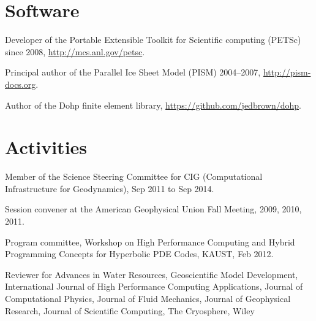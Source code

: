 \documentclass[10pt,letterpaper]{article}
\renewenvironment{itemize}{
  \begin{list}{}{
    \setlength{\leftmargin}{1.5em}
    \setlength{\itemsep}{0.25em}
    \setlength{\parskip}{0pt}
    \setlength{\parsep}{0.25em}
  }
}{
  \end{list}
}
\begin{document}
\section*{Software}
\begin{itemize}
\item Developer of the Portable Extensible Toolkit for Scientific computing (PETSc) since 2008, \url{http://mcs.anl.gov/petsc}.
\item Principal author of the Parallel Ice Sheet Model (PISM) 2004--2007, \url{http://pism-docs.org}.
\item Author of the Dohp finite element library, \url{https://github.com/jedbrown/dohp}.
\end{itemize}

\section*{Activities}
\begin{itemize}
\item Member of the Science Steering Committee for CIG (Computational Infrastructure for Geodynamics), Sep 2011 to Sep 2014.
\item Session convener at the American Geophysical Union Fall Meeting, 2009, 2010, 2011.
\item Program committee, Workshop on High Performance Computing and Hybrid Programming Concepts for Hyperbolic PDE Codes, KAUST, Feb 2012.
\item Reviewer for
  Advances in Water Resources,
  Geoscientific Model Development,
  International Journal of High Performance Computing Applications,
  Journal of Computational Physics,
  Journal of Fluid Mechanics,
  Journal of Geophysical Research,
  Journal of Scientific Computing,
  The Cryosphere,
  Wiley
\end{itemize}

\end{document}
